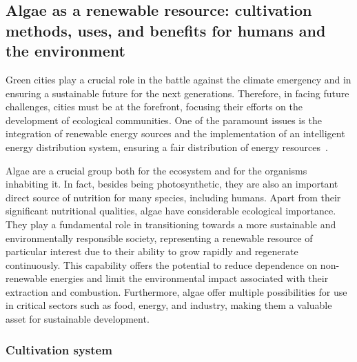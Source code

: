 \subsection{Algae as a renewable resource: cultivation methods, uses, and benefits for humans and the environment}
Green cities play a crucial role in the battle against the climate emergency and in ensuring a sustainable future for the next generations. Therefore, in facing future challenges, cities must be at the forefront, focusing their efforts on the development of ecological communities. One of the paramount issues is the integration of renewable energy sources and the implementation of an intelligent energy distribution system, ensuring a fair distribution of energy resources~\parencite{chew_Algae_2021}.

Algae are a crucial group both for the ecosystem and for the organisms inhabiting it. In fact, besides being photosynthetic, they are also an important direct source of nutrition for many species, including humans. Apart from their significant nutritional qualities, algae have considerable ecological importance. They play a fundamental role in transitioning towards a more sustainable and environmentally responsible society, representing a renewable resource of particular interest due to their ability to grow rapidly and regenerate continuously. This capability offers the potential to reduce dependence on non-renewable energies and limit the environmental impact associated with their extraction and combustion. Furthermore, algae offer multiple possibilities for use in critical sectors such as food, energy, and industry, making them a valuable asset for sustainable development.


\subsubsection{Cultivation system}

